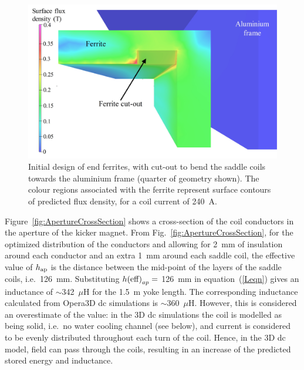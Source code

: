 \documentclass[aps,prab,twocolumn,superscriptaddress]{revtex4-1}
\begin{document}
\begin{figure}[t]
	\includegraphics[width=\linewidth]{Ferrite-with-cutout.jpg} %
	\caption{Initial design of end ferrites, with cut-out to bend the saddle coils towards the aluminium frame (quarter of geometry shown). The colour regions  associated with the ferrite represent surface contours of predicted flux density, for a coil current of 240~A.}
	\label{fig:FerriteCutOut}
\end{figure}

Figure~\ref{fig:ApertureCrossSection} shows a cross-section of the coil conductors in the aperture of the kicker magnet. 
 From Fig.~\ref{fig:ApertureCrossSection}, for the optimized distribution of the conductors and allowing for 2~mm of insulation around each conductor and an extra 1~mm around each saddle coil, the effective value of $h_{\rm{ap}}$ is the distance between the mid-point of the layers of the saddle coils, i.e.~126~mm. Substituting $h{\rm(eff)}_{ap} = $ 126~mm in equation~(\ref{Leqn}) gives an inductance of $\sim$342~$\mu$H for the 1.5~m yoke length.  The corresponding inductance calculated from Opera3D dc simulations is $\sim$360~$\mu$H. However, this is considered an overestimate of the value: in the 3D dc simulations the coil is modelled as being solid, i.e.~no water cooling channel (see below), and current is considered to be evenly distributed throughout each turn of the coil. Hence, in the 3D dc model, field can pass through the coils, resulting in an increase of the predicted stored energy and inductance. 
\end{document}
